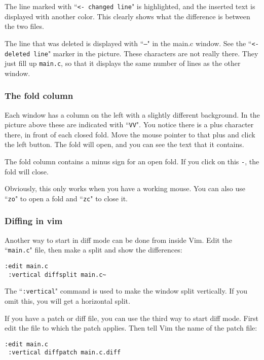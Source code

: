 The line marked with ``\texttt{<- changed line}" is highlighted, and the inserted text is displayed with another color.
This clearly shows what the difference is between the two files.

The line that was deleted is displayed with ``\texttt{---}" in the main.c window.
See the ``\texttt{<- deleted line}" marker in the picture.
These characters are not really there.
They just fill up \texttt{main.c}, so that it displays the same number of lines as the other window.

\subsubsection{The fold column}
Each window has a column on the left with a slightly different background.
In the picture above these are indicated with ``\texttt{VV}".
You notice there is a plus character there, in front of each closed fold.
Move the mouse pointer to that plus and click the left button.
The fold will open, and you can see the text that it contains.

The fold column contains a minus sign for an open fold.
If you click on this \texttt{-}, the fold will close.

Obviously, this only works when you have a working mouse.
You can also use ``\texttt{zo}" to open a fold and ``\texttt{zc}" to close it.

\subsubsection{Diffing in vim}
Another way to start in diff mode can be done from inside Vim.
Edit the ``\texttt{main.c}" file, then make a split and show the differences:

 \begin{Verbatim}[samepage=true]
 :edit main.c
 :vertical diffsplit main.c~
 \end{Verbatim}

The ``\texttt{:vertical}" command is used to make the window split vertically.
If you omit this, you will get a horizontal split.

If you have a patch or diff file, you can use the third way to start diff mode.
First edit the file to which the patch applies.
Then tell Vim the name of the patch file:

 \begin{Verbatim}[samepage=true]
 :edit main.c
 :vertical diffpatch main.c.diff
 \end{Verbatim}

